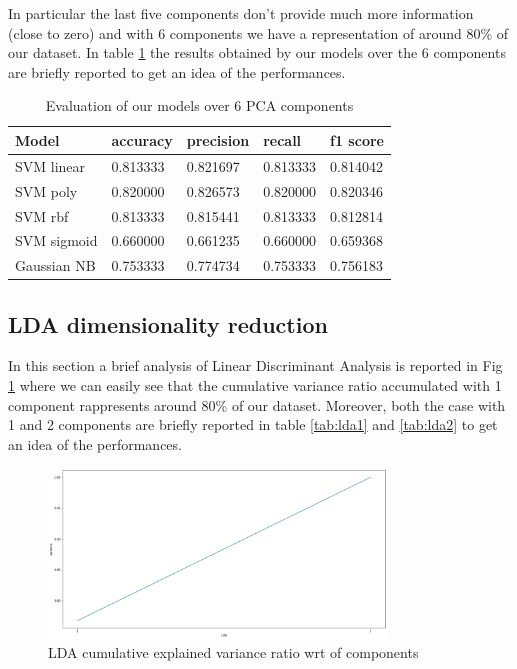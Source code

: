 \documentclass[a4paper,12pt]{article}
\begin{document}
\noindent In particular the last five components don't provide much more information (close to zero) and with 6 components we have a representation of around 80\% of our dataset. In table \ref{tab:pca} the results obtained by our models over the 6 components are briefly reported to get an idea of the performances.

\begin{table}[H]
  \begin{tabular}{ |p{6cm}||p{2cm}|p{2cm}|p{2cm}|p{2cm}| }
    \hline
    Model& accuracy & precision  &  recall & f1 score \\
    \hline
    SVM linear           &0.813333&   0.821697&  0.813333&  0.814042\\
    SVM poly             &0.820000&   0.826573&  0.820000&  0.820346\\
    SVM rbf              &0.813333&   0.815441&  0.813333&  0.812814\\
    SVM sigmoid          &0.660000&   0.661235&  0.660000&  0.659368\\
    Gaussian NB          &0.753333&   0.774734&  0.753333&  0.756183\\
    \hline
  \end{tabular}
  \caption{Evaluation of our models over 6 PCA components}
  \label{tab:pca}
  \end{table}

\newpage
\subsection{LDA dimensionality reduction}

In this section a brief analysis of Linear Discriminant Analysis is reported in Fig \ref{fig:lda} where we can easily see that the cumulative variance ratio accumulated with 1 component rappresents around 80\% of our dataset.
Moreover, both the case with 1 and 2 components are briefly reported in table \ref{tab:lda1} and \ref{tab:lda2} to get an idea of the performances. 

\begin{figure}[H]
  \begin{center}
  \includegraphics[width=0.8\textwidth]{images/lda.png}
  \end{center}
  \caption{LDA cumulative explained variance ratio wrt of components}
  \label{fig:lda}
\end{figure}
\end{document}
